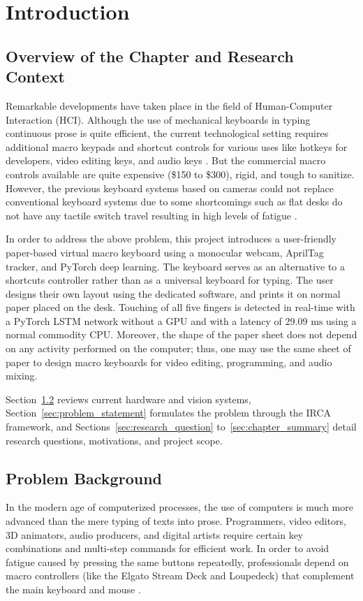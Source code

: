 \chapter{Introduction}
\label{ch:introduction}

\section{Overview of the Chapter and Research Context}
\label{sec:chapter_overview}
Remarkable developments have taken place in the field of Human-Computer Interaction (HCI). Although the use of mechanical keyboards in typing continuous prose is quite efficient, the current technological setting requires additional macro keypads and shortcut controls for various uses like hotkeys for developers, video editing keys, and audio keys \cite{ReviewVirtualKeyboard2020, Lee2022Virtual}. But the commercial macro controls available are quite expensive (\$150 to \$300), rigid, and tough to sanitize. However, the previous keyboard systems based on cameras could not replace conventional keyboard systems due to some shortcomings such as flat desks do not have any tactile switch travel resulting in high levels of fatigue \cite{ReviewVirtualKeyboard2020}.

In order to address the above problem, this project introduces a user-friendly paper-based virtual macro keyboard using a monocular webcam, AprilTag tracker, and PyTorch deep learning. The keyboard serves as an alternative to a shortcuts controller rather than as a universal keyboard for typing. The user designs their own layout using the dedicated software, and prints it on normal paper placed on the desk. Touching of all five fingers is detected in real-time with a PyTorch LSTM network without a GPU and with a latency of $29.09\text{ ms}$ using a normal commodity CPU. Moreover, the shape of the paper sheet does not depend on any activity performed on the computer; thus, one may use the same sheet of paper to design macro keyboards for video editing, programming, and audio mixing.

Section~\ref{sec:problem_background} reviews current hardware and vision systems, Section~\ref{sec:problem_statement} formulates the problem through the IRCA framework, and Sections~\ref{sec:research_question} to~\ref{sec:chapter_summary} detail research questions, motivations, and project scope.

\section{Problem Background}
\label{sec:problem_background}
In the modern age of computerized processes, the use of computers is much more advanced than the mere typing of texts into prose. Programmers, video editors, 3D animators, audio producers, and digital artists require certain key combinations and multi-step commands for efficient work. In order to avoid fatigue caused by pressing the same buttons repeatedly, professionals depend on macro controllers (like the Elgato Stream Deck and Loupedeck) that complement the main keyboard and mouse \cite{ReviewVirtualKeyboard2020, Lee2022Virtual}.

